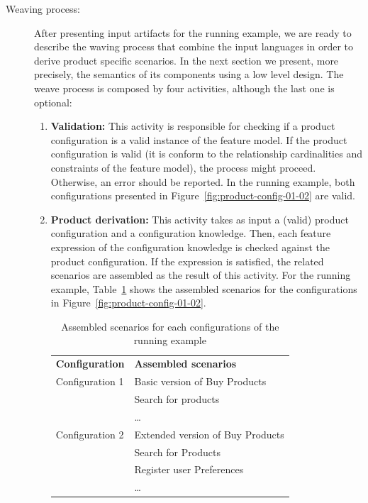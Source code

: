 \documentclass{acm_proc_article-sp}
\begin{document}
\begin{description}
\item[Weaving process:] After presenting input artifacts for the running example, we are ready to describe the waving process that combine 
the input languages in order to derive product specific scenarios. In the next section we present, more precisely, the semantics of its components using a low level design. The weave process is composed by four activities, although the last one is optional: 

\begin{enumerate}
\item {\bf Validation:} This activity is responsible for checking if a product configuration is a valid instance of the feature model. If the product configuration is 
valid (it is conform to the relationship cardinalities and constraints of the feature model), the process might proceed. Otherwise, an error should be reported. In the running example, both configurations presented in Figure~\ref{fig:product-config-01-02} are valid. 

\item {\bf Product derivation:} This activity takes as input a (valid) product configuration and a configuration knowledge. Then, each feature expression of the 
configuration knowledge is checked against the product configuration. If the expression is satisfied, the related scenarios are assembled as the result of 
this activity. For the running example, Table~\ref{tab:assembled-scenarios} shows the assembled scenarios for the configurations in  
Figure~\ref{fig:product-config-01-02}.

\begin{table}[h]
\begin{center}
\caption{Assembled scenarios for each configurations of the running example} \label{tab:assembled-scenarios}
\begin{tabular}{ll}
   \hline\noalign{\smallskip}
  {\bf Configuration} & {\bf Assembled scenarios} \\
   \noalign{\smallskip}
   \hline
   \noalign{\smallskip}
    Configuration 1\hspace{15pt} & Basic version of Buy Products \\
                             & Search for products \\
                             & \ldots \\
   Configuration 2 & Extended version of Buy Products \\
                             & Search for Products	 \\
                             & Register user Preferences \\
                             & \ldots       \\
  \hline
\end{tabular}
\end{center}
\end{table}
 

\end{enumerate}
\end{description}
\end{document}
